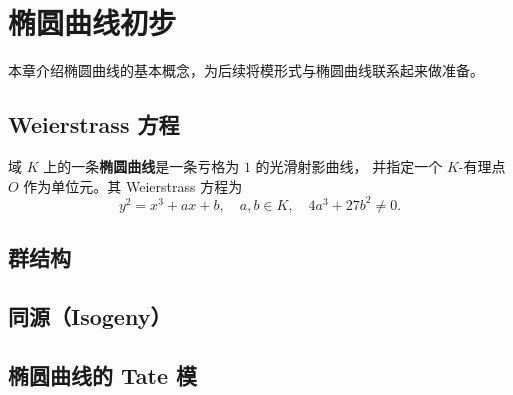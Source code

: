 \chapter{椭圆曲线初步}
\label{ch:elliptic-curves-intro}

本章介绍椭圆曲线的基本概念，为后续将模形式与椭圆曲线联系起来做准备。

\section{Weierstrass 方程}

\begin{definition}[椭圆曲线]
域 $K$ 上的一条\textbf{椭圆曲线}是一条亏格为 $1$ 的光滑射影曲线，
并指定一个 $K$-有理点 $O$ 作为单位元。其 Weierstrass 方程为
\[
  y^2 = x^3 + ax + b, \quad a, b \in K, \quad 4a^3 + 27b^2 \neq 0.
\]
\end{definition}

\section{群结构}


\section{同源（Isogeny）}


\section{椭圆曲线的 Tate 模}


